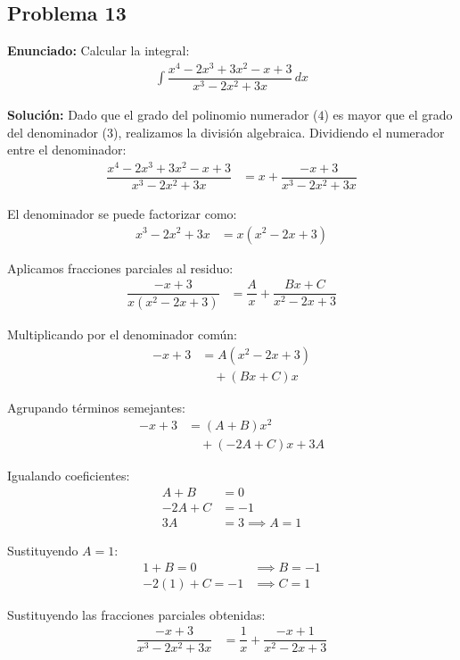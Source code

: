 \subsection*{Problema 13}
\textbf{Enunciado:} Calcular la integral:
\begin{align*}
\int \dfrac{x^4 - 2x^3 + 3x^2 - x + 3}{x^3 - 2x^2 + 3x} \, dx
\end{align*}

\textbf{Solución:} Dado que el grado del polinomio numerador ($4$) es mayor que el grado del denominador ($3$), realizamos la división algebraica. Dividiendo el numerador entre el denominador:
\begin{align*}
\dfrac{x^4 - 2x^3 + 3x^2 - x + 3}{x^3 - 2x^2 + 3x} &= x + \dfrac{-x + 3}{x^3 - 2x^2 + 3x}
\end{align*}

El denominador se puede factorizar como:
\begin{align*}
x^3 - 2x^2 + 3x &= x(x^2 - 2x + 3)
\end{align*}

Aplicamos fracciones parciales al residuo:
\begin{align*}
\dfrac{-x + 3}{x(x^2 - 2x + 3)} &= \dfrac{A}{x} + \dfrac{Bx + C}{x^2 - 2x + 3}
\end{align*}

Multiplicando por el denominador común:
\begin{align*}
-x + 3 &= A(x^2 - 2x + 3) \\
&\quad + (Bx + C)x
\end{align*}

Agrupando términos semejantes:
\begin{align*}
-x + 3 &= (A + B)x^2 \\
&\quad + (-2A + C)x + 3A
\end{align*}

Igualando coeficientes:
\begin{align*}
A + B &= 0 \\
-2A + C &= -1 \\
3A &= 3 \implies A = 1
\end{align*}

Sustituyendo $A = 1$:
\begin{align*}
1 + B = 0 &\implies B = -1 \\
-2(1) + C = -1 &\implies C = 1
\end{align*}

Sustituyendo las fracciones parciales obtenidas:
\begin{align*}
\dfrac{-x + 3}{x^3 - 2x^2 + 3x} &= \dfrac{1}{x} + \dfrac{-x + 1}{x^2 - 2x + 3}
\end{align*}

